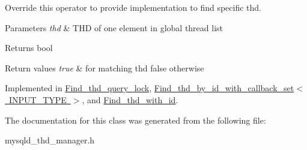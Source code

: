 Override this operator to provide implementation to find specific thd.


\begin{DoxyParams}{Parameters}
{\em thd} & T\+HD of one element in global thread list\\
\hline
\end{DoxyParams}
\begin{DoxyReturn}{Returns}
bool 
\end{DoxyReturn}

\begin{DoxyRetVals}{Return values}
{\em true} & for matching thd false otherwise \\
\hline
\end{DoxyRetVals}


Implemented in \mbox{\hyperlink{classFind__thd__query__lock_a966a09cb01db67bb82ff6b8446cc0fe6}{Find\+\_\+thd\+\_\+query\+\_\+lock}}, \mbox{\hyperlink{classFind__thd__by__id__with__callback__set_a3a8c6f9be71c9572a34fece05ef95add}{Find\+\_\+thd\+\_\+by\+\_\+id\+\_\+with\+\_\+callback\+\_\+set$<$ I\+N\+P\+U\+T\+\_\+\+T\+Y\+P\+E $>$}}, and \mbox{\hyperlink{classFind__thd__with__id_a0a1d128b4bb4ca839a1814e0737c5d0d}{Find\+\_\+thd\+\_\+with\+\_\+id}}.



The documentation for this class was generated from the following file\+:\begin{DoxyCompactItemize}
\item 
mysqld\+\_\+thd\+\_\+manager.\+h\end{DoxyCompactItemize}

